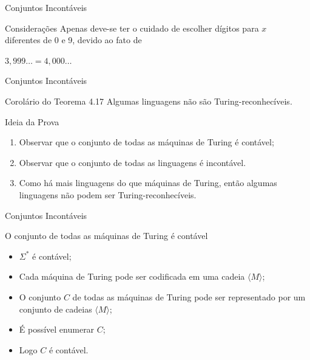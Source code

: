 \documentclass[xcolor=dvipsnames,table]{beamer}
\begin{document}
	\begin{frame}{Conjuntos Incontáveis}
		\begin{block}{Considerações}
			Apenas deve-se ter o cuidado de escolher dígitos para $x$ \\diferentes de 0 e 9, devido ao fato de 
			\begin{center}
				$3,999 \ldots = 4,000 \ldots$
			\end{center}
		\end{block}
	\end{frame}
	
	\begin{frame}{Conjuntos Incontáveis}
		\begin{exampleblock}{Corolário do Teorema 4.17}
			Algumas linguagens não são Turing-reconhecíveis.
		\end{exampleblock} 
		\begin{block}{Ideia da Prova}
			\begin{enumerate}
				\item Observar que o conjunto de todas as máquinas de Turing é contável;
				\item Observar que o conjunto de todas as linguagens é incontável.
				\item Como há mais linguagens do que máquinas de Turing, então algumas linguagens não podem ser Turing-reconhecíveis.
			\end{enumerate}
		\end{block}
	\end{frame}
	
	\begin{frame}{Conjuntos Incontáveis}
		\begin{block}{O conjunto de todas as máquinas de Turing é contável}
			\begin{itemize}
				\item $\Sigma^*$ é contável;
				\item Cada máquina de Turing pode ser codificada em uma cadeia $\langle M \rangle$;
				\item O conjunto $C$ de todas as máquinas de Turing pode ser representado por um conjunto de cadeias $\langle M \rangle$;
				\item É possível enumerar $C$;
				\item Logo $C$ é contável.
			\end{itemize}
		\end{block}
	\end{frame}
	
\end{document}
